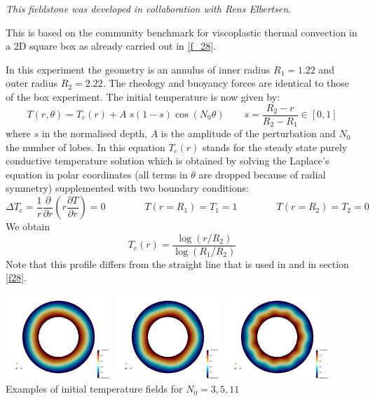 {\sl This fieldstone was developed in collaboration with Rens Elbertsen}. 

This is based on the community benchmark for viscoplastic thermal convection
in a 2D square box \cite{tosn15} as already carried out in \ref{f_28}.

In this experiment the geometry is an annulus of inner radius 
$R_1=1.22$ and outer radius $R_2=2.22$. 
The rheology and buoyancy forces are identical to those of the box 
experiment. The initial temperature is now given by:
\[
T(r,\theta) = T_c(r)+A\; s(1-s) \cos(N_0 \theta)
\quad\quad s=\frac{R_2-r}{R_2-R_1} \in [0,1]
\]
where $s$ in the normalised depth, $A$ is the amplitude of the perturbation and $N_0$ the 
number of lobes. In this equation $T_c(r)$ stands for the steady state purely conductive 
temperature solution which is obtained by solving the Laplace's equation in 
polar coordinates (all terms in $\theta$ are dropped because of radial symmetry) 
supplemented with two boundary conditions:
\[
\Delta T_c = \frac{1}{r}\frac{\partial }{\partial r} \left( r \frac{\partial T}{\partial r} \right) =0 
\quad\quad
\quad\quad
T(r=R_1)=T_1=1
\quad\quad
\quad\quad
T(r=R_2)=T_2=0
\]
We obtain 
\[
T_c(r)=\frac{\log (r/R_2)}{\log(R_1/R_2)}
\]
Note that this profile differs from the straight line that is used in \cite{tosn15} and in section \ref{f28}.

\begin{center}
\includegraphics[width=4cm]{python_codes/fieldstone_33/images/T_N03}
\includegraphics[width=4cm]{python_codes/fieldstone_33/images/T_N05}
\includegraphics[width=4cm]{python_codes/fieldstone_33/images/T_N11}\\
{\small Examples of initial temperature fields for $N_0=3,5,11$}
\end{center}

